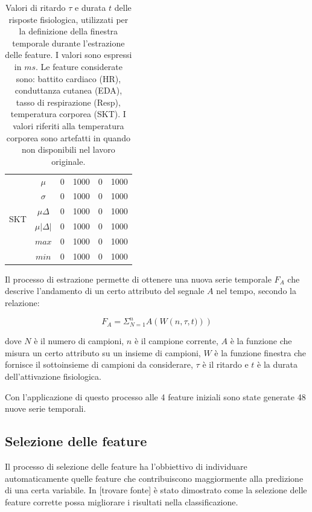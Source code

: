 \begin{table}[]
\begin{tabular}{|c|c|cc|cc|}
\hline
\multirow{6}{*}{SKT} & $\mu$                      & 0    & 1000 & 0    & 1000 \\
                     & $\sigma$                   & 0    & 1000 & 0    & 1000 \\
                     & $\mu\Delta$                & 0    & 1000 & 0    & 1000 \\
                     & $\mu\left|\Delta\right|$   & 0    & 1000 & 0    & 1000 \\
                     & $max$                      & 0    & 1000 & 0    & 1000 \\
                     & $min$                      & 0    & 1000 & 0    & 1000 \\
\hline
\end{tabular}%
\caption{Valori di ritardo $\tau$ e durata $t$ delle risposte fisiologica, utilizzati per la definizione della finestra temporale durante l'estrazione delle feature. I valori sono espressi in $ms$. Le feature considerate sono: battito cardiaco (HR), conduttanza cutanea (EDA), tasso di respirazione (Resp), temperatura corporea (SKT). I valori riferiti alla temperatura corporea sono artefatti in quando non disponibili nel lavoro originale.}
\label{tab:async_window_values}
\end{table}

Il processo di estrazione permette di ottenere una nuova serie temporale $F_A$ che descrive l'andamento di un certo attributo del segnale $A$ nel tempo, secondo la relazione:

\begin{equation}
F_A = \Sigma_{N=1}^{n}A\left(W\left(n,\tau,t)\right)\right)
\end{equation}

dove $N$ è il numero di campioni, $n$ è il campione corrente, $A$ è la funzione che misura un certo attributo su un insieme di campioni, $W$ è la funzione finestra che fornisce il sottoinsieme di campioni da considerare, $\tau$ è il ritardo e $t$ è la durata dell'attivazione fisiologica.

Con l'applicazione di questo processo alle 4 feature iniziali sono state generate 48 nuove serie temporali.

\subsection{Selezione delle feature}
Il processo di selezione delle feature ha l'obbiettivo di individuare automaticamente quelle feature che contribuiscono maggiormente alla predizione di una certa variabile. In [trovare fonte] è stato dimostrato come la selezione delle feature corrette possa migliorare i risultati nella classificazione.

